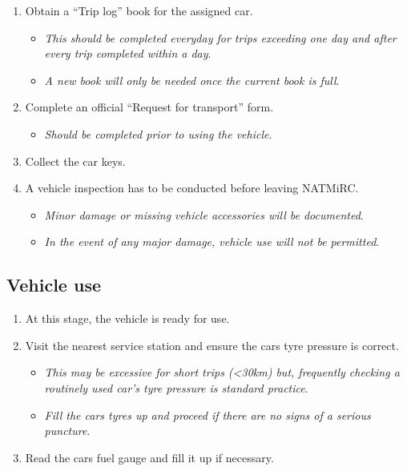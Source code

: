 \documentclass[
  letterpaper,
  DIV=11,
  numbers=noendperiod]{scrreprt}
\providecommand{\tightlist}{%
  \setlength{\itemsep}{0pt}\setlength{\parskip}{0pt}}\usepackage{longtable,booktabs,array}
\begin{document}
\begin{enumerate}
\def\labelenumi{\arabic{enumi}.}
\setcounter{enumi}{2}
\tightlist
\item
  Obtain a ``Trip log'' book for the assigned car.

  \begin{itemize}
  \tightlist
  \item
    \emph{This should be completed everyday for trips exceeding one day
    and after every trip completed within a day}.
  \item
    \emph{A new book will only be needed once the current book is full}.
  \end{itemize}
\item
  Complete an official ``Request for transport'' form.

  \begin{itemize}
  \tightlist
  \item
    \emph{Should be completed prior to using the vehicle}.
  \end{itemize}
\item
  Collect the car keys.
\item
  A vehicle inspection has to be conducted before leaving NATMiRC.

  \begin{itemize}
  \tightlist
  \item
    \emph{Minor damage or missing vehicle accessories will be
    documented}.
  \item
    \emph{In the event of any major damage, vehicle use will not be
    permitted}.
  \end{itemize}
\end{enumerate}

\hypertarget{vehicle-use}{%
\subsection{Vehicle use}\label{vehicle-use}}

\begin{enumerate}
\def\labelenumi{\arabic{enumi}.}
\setcounter{enumi}{6}
\tightlist
\item
  At this stage, the vehicle is ready for use.
\item
  Visit the nearest service station and ensure the cars tyre pressure is
  correct.

  \begin{itemize}
  \tightlist
  \item
    \emph{This may be excessive for short trips (\textless30km) but,
    frequently checking a routinely used car's tyre pressure is standard
    practice}.
  \item
    \emph{Fill the cars tyres up and proceed if there are no signs of a
    serious puncture}.
  \end{itemize}
\item
  Read the cars fuel gauge and fill it up if necessary.
\end{enumerate}
\end{document}

